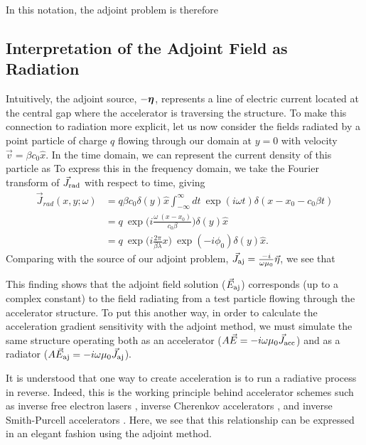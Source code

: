 In this notation, the adjoint problem is therefore
%
%

\subsection{Interpretation of the Adjoint Field as Radiation}

Intuitively, the adjoint source, $-\bm{\eta}$, represents a line of electric current located at the central gap where the accelerator is traversing the structure.
To make this connection to radiation more explicit, let us now consider the fields radiated by a point particle of charge $q$ flowing through our domain at $y = 0$ with velocity $\vec{v} = \beta c_0 \hat{x}$.
In the time domain, we can represent the current density of this particle as
%
%
To express this in the frequency domain, we take the Fourier transform of $\vec{J}_\textrm{rad}$ with respect to time, giving
%
\begin{align}
    \vec{J}_{rad}(x,y;\omega) &= q \beta c_0 \delta(y)\hat{x}\int _{-\infty}^{\infty}{dt\ }\exp(i\omega t)\delta(x-x_0-c_0\beta t)\\
    &= q\ \exp\Big(i\frac{\omega\ (x-x_0)}{c_0 \beta}\Big)\delta(y)\hat{x}\\
    &= q\ \exp\Big(i\frac{2\pi}{ \beta\lambda}x\Big)\ \exp(-i\phi_0)\delta(y)\hat{x}.
\label{eq:point-current}
\end{align}
%
Comparing with the source of our adjoint problem, $\vec{J}_{\textrm{aj}} = \frac{-i}{\omega\mu_0}\vec{\eta}$, we see that 
%

This finding shows that the adjoint field solution ($\vec{E}_{\textrm{aj}}$) corresponds (up to a complex constant) to the field radiating from a test particle flowing through the accelerator structure.
To put this another way, in order to calculate the acceleration gradient sensitivity with the adjoint method, we must simulate the same structure operating both as an accelerator ($A\vec{E}=-i\omega\mu_0\vec{J}_\textrm{acc}$) and as a radiator ($A\vec{E}_{\textrm{aj}}=-i\omega\mu_0\vec{J}_{\textrm{aj}}$).

It is understood that one way to create acceleration is to run a radiative process in reverse.
Indeed, this is the working principle behind accelerator schemes such as inverse free electron lasers \cite{musumeci2005high, courant1985high}, inverse Cherenkov accelerators \cite{kimura1995laser, fontana1983high}, and inverse Smith-Purcell accelerators \cite{bae1992experimental, mizuno1987experimental}.
Here, we see that this relationship can be expressed in an elegant fashion using the adjoint method.

